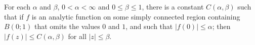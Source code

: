 For each $\alpha$ and $\beta$, $0 < \alpha < \infty$ and $0 \leq \beta \leq 1$, there is a constant $C(\alpha, \beta)$ such that if $f$ is an analytic function on some simply connected region containing $B(0; 1)$ that omits the values $0$ and $1$, and such that $|f(0)| \leq \alpha$; then $|f(z)| \leq C(\alpha, \beta)$ for all $|z| \leq \beta$.
